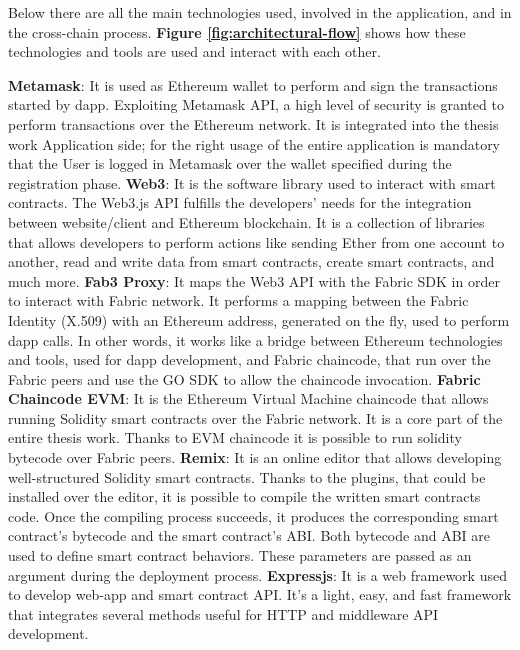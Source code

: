 Below there are all the main technologies used, involved in the application, and in the cross-chain process.
\textbf{Figure \ref{fig:architectural-flow}} shows how these technologies and tools are used and 
interact with each other. 

\begin{outline}
    \1 \textbf{Metamask}: It is used as Ethereum wallet to perform and sign the transactions started by dapp.
    Exploiting Metamask API, a high level of security is granted to perform transactions over the Ethereum network. 
    It is integrated into the thesis work Application side; for the right usage of the entire application is
    mandatory that the User is logged in Metamask over the wallet specified during the registration phase.  
    \1 \textbf{Web3}: It is the software library used to interact with smart contracts.
    The Web3.js API fulfills the developers' needs for the integration between website/client and Ethereum blockchain.
    It is a collection of libraries that allows developers to perform actions like sending Ether from one account to another, read 
    and write data from smart contracts, create smart contracts, and much more. 
    \1 \textbf{Fab3 Proxy}: It maps the Web3 API with the Fabric SDK in order to interact with
    Fabric network. It performs a mapping between the Fabric Identity (X.509) with an Ethereum address, generated on the fly,
    used to perform dapp calls. In other words, it works like a bridge between Ethereum technologies and tools, used 
    for dapp development, and Fabric chaincode, that run over the Fabric peers and use the GO SDK to allow 
    the chaincode invocation.  
    \1 \textbf{Fabric Chaincode EVM}: It is the Ethereum Virtual Machine chaincode that allows running Solidity smart contracts
    over the Fabric network. It is a core part of the entire thesis work. Thanks to EVM chaincode it is
    possible to run solidity bytecode over Fabric peers.
    \1 \textbf{Remix}: It is an online editor that allows developing well-structured Solidity smart contracts. 
    Thanks to the plugins, that could be installed over the editor, it is possible to compile the written 
    smart contracts code. Once the compiling process succeeds, it produces the corresponding smart contract's 
    bytecode and the smart contract's ABI. Both bytecode and ABI are used to define smart contract behaviors. These parameters are passed as an argument during the deployment process. 
    \1 \textbf{Expressjs}: It is a web framework used to develop web-app and smart contract API.
    It's a light, easy, and fast framework that integrates several methods useful for HTTP and middleware API development. 

\end{outline}
